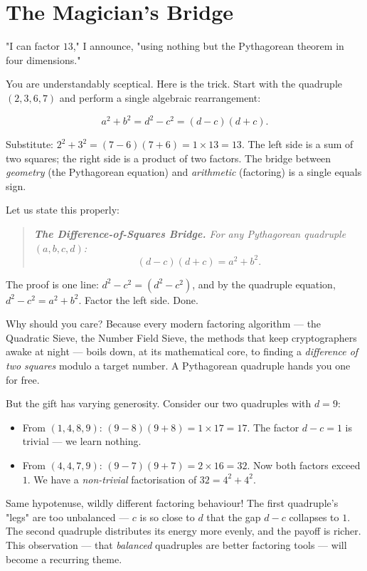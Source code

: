 \bigskip


\section{The Magician's Bridge}

"I can factor $13$," I announce, "using nothing but the Pythagorean theorem in four dimensions."

You are understandably sceptical. Here is the trick. Start with the quadruple $(2, 3, 6, 7)$ and perform a single algebraic rearrangement:

\[
a^2 + b^2 = d^2 - c^2 = (d - c)(d + c).
\]

Substitute: $2^2 + 3^2 = (7 - 6)(7 + 6) = 1 \times 13 = 13$. The left side is a sum of two squares; the right side is a product of two factors. The bridge between \textit{geometry} (the Pythagorean equation) and \textit{arithmetic} (factoring) is a single equals sign.

Let us state this properly:

\begin{quote}
\itshape \textbf{The Difference-of-Squares Bridge.} For any Pythagorean quadruple $(a, b, c, d)$: $$(d - c)(d + c) = a^2 + b^2.$$
\end{quote}

The proof is one line: $d^2 - c^2 = (d^2 - c^2)$, and by the quadruple equation, $d^2 - c^2 = a^2 + b^2$. Factor the left side. Done.

Why should you care? Because every modern factoring algorithm --- the Quadratic Sieve, the Number Field Sieve, the methods that keep cryptographers awake at night --- boils down, at its mathematical core, to finding a \textit{difference of two squares} modulo a target number. A Pythagorean quadruple hands you one for free.

But the gift has varying generosity. Consider our two quadruples with $d = 9$:

\begin{itemize}
\item From $(1, 4, 8, 9)$: $(9 - 8)(9 + 8) = 1 \times 17 = 17$. The factor $d - c = 1$ is trivial --- we learn nothing.
\item From $(4, 4, 7, 9)$: $(9 - 7)(9 + 7) = 2 \times 16 = 32$. Now both factors exceed $1$. We have a \textit{non-trivial} factorisation of $32 = 4^2 + 4^2$.
\end{itemize}
Same hypotenuse, wildly different factoring behaviour! The first quadruple's "legs" are too unbalanced --- $c$ is so close to $d$ that the gap $d - c$ collapses to $1$. The second quadruple distributes its energy more evenly, and the payoff is richer. This observation --- that \textit{balanced} quadruples are better factoring tools --- will become a recurring theme.

